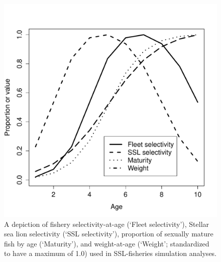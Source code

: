 \documentclass[nonumbib,leqno]{nrc1}
\begin{document}
\begin{figure}
\begin{center}
\includegraphics[width= \textwidth]{At_age_plots.pdf}
\end{center}
\caption{A depiction of fishery selectivity-at-age (`Fleet selectivity'), Stellar sea lion selectivity (`SSL selectivity'), proportion of sexually
mature fish by age (`Maturity'), and weight-at-age (`Weight'; standardized to have a maximum of 1.0) used
in SSL-fisheries simulation analyses.}
\label{fig:at_age}
\end{figure}
\end{document}
